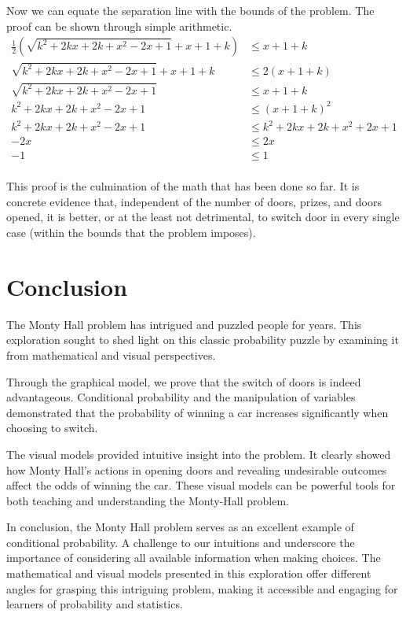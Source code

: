 \documentclass{article}
\begin{document}
Now we can equate the separation line with the bounds of the problem. The proof can be shown through simple arithmetic.
\begin{equation*}
\begin{aligned}
    \frac{1}{2}\left(\sqrt{k^2+2 k x+2 k+x^2-2 x+1}+x+1+k\right) &\leq x+1+k\\
    \sqrt{k^2+2 k x+2 k+x^2-2 x+1}+x+1+k &\leq 2(x+1+k)\\
    \sqrt{k^2+2 k x+2 k+x^2-2 x+1} &\leq x+1+k\\
    k^2+2 k x+2 k+x^2-2 x+1 &\leq (x+1+k)^2\\
    k^2+2 k x+2 k+x^2-2 x+1 &\leq k^2 + 2 k x + 2 k + x^2 + 2 x + 1\\
    -2 x &\leq 2 x\\
    -1 &\leq 1\\
\end{aligned}
\end{equation*}

This proof is the culmination of the math that has been done so far. It is concrete evidence that, independent of the number of doors, prizes, and doors opened, it is better, or at the least not detrimental, to switch door in every single case (within the bounds that the problem imposes).

\section*{Conclusion}
The Monty Hall problem has intrigued and puzzled people for years. This exploration sought to shed light on this classic probability puzzle by examining it from mathematical and visual perspectives.
\par
Through the graphical model, we prove that the switch of doors is indeed advantageous. Conditional probability and the manipulation of variables demonstrated that the probability of winning a car increases significantly when choosing to switch.
\par
The visual models provided intuitive insight into the problem. It clearly showed how Monty Hall's actions in opening doors and revealing undesirable outcomes affect the odds of winning the car. These visual models can be powerful tools for both teaching and understanding the Monty-Hall problem.
\par
In conclusion, the Monty Hall problem serves as an excellent example of conditional probability. A challenge to our intuitions and underscore the importance of considering all available information when making choices. The mathematical and visual models presented in this exploration offer different angles for grasping this intriguing problem, making it accessible and engaging for learners of probability and statistics.
\pagebreak

\end{document}
